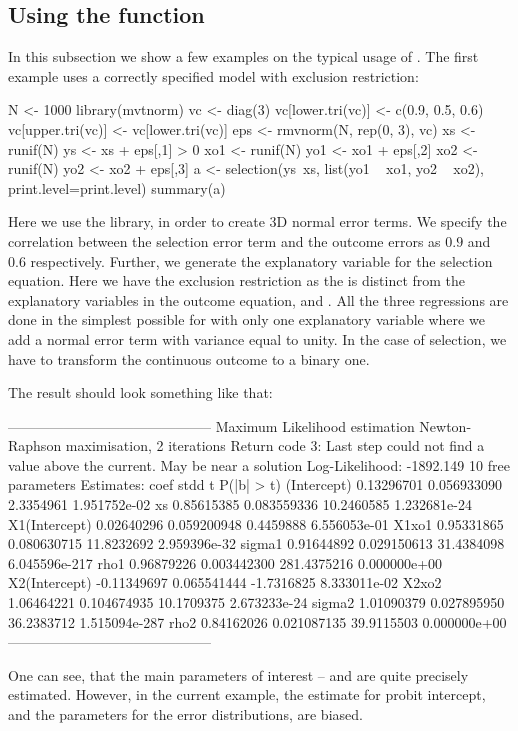 \subsection[Usage]{Using the  function}

In this subsection we show a few examples on the typical usage of
.  The first example uses a correctly specified model
with exclusion restriction:

\begin{Schunk}
\begin{Sinput}
  N <- 1000
  library(mvtnorm)
  vc <- diag(3)
  vc[lower.tri(vc)] <- c(0.9, 0.5, 0.6)
  vc[upper.tri(vc)] <- vc[lower.tri(vc)]
  eps <- rmvnorm(N, rep(0, 3), vc)
  xs <- runif(N)
  ys <- xs + eps[,1] > 0
  xo1 <- runif(N)
  yo1 <- xo1 + eps[,2]
  xo2 <- runif(N)
  yo2 <- xo2 + eps[,3]
  a <- selection(ys~xs, list(yo1 ~ xo1, yo2 ~ xo2), print.level=print.level)
  summary(a)
\end{Sinput}
\end{Schunk}

Here we use the  library, in order to create 3D normal
error terms.  We specify the correlation between the selection error
term and the outcome errors as $0.9$ and $0.6$ respectively.  Further,
we generate the explanatory variable  for the selection
equation.  Here we have the exclusion restriction as the  is
distinct from the explanatory variables in the outcome equation,
 and .  All the three regressions are done in the
simplest possible for with only one explanatory variable where we add
a normal error term with variance equal to unity.  In the case of
selection, we have to transform the continuous outcome to a binary
one.

The result should look something like that:
\begin{Schunk}
\begin{Soutput}
   --------------------------------------------
   Maximum Likelihood estimation
   Newton-Raphson maximisation, 2 iterations
   Return code 3: Last step could not find a value above the current.
   May be near a solution
   Log-Likelihood: -1892.149 
   10  free parameters
   Estimates:
   coef        stdd           t    P(|b| > t)
   (Intercept)    0.13296701 0.056933090   2.3354961  1.951752e-02
   xs             0.85615385 0.083559336  10.2460585  1.232681e-24
   X1(Intercept)  0.02640296 0.059200948   0.4459888  6.556053e-01
   X1xo1          0.95331865 0.080630715  11.8232692  2.959396e-32
   sigma1         0.91644892 0.029150613  31.4384098 6.045596e-217
   rho1           0.96879226 0.003442300 281.4375216  0.000000e+00
   X2(Intercept) -0.11349697 0.065541444  -1.7316825  8.333011e-02
   X2xo2          1.06464221 0.104674935  10.1709375  2.673233e-24
   sigma2         1.01090379 0.027895950  36.2383712 1.515094e-287
   rho2           0.84162026 0.021087135  39.9115503  0.000000e+00
   --------------------------------------------
\end{Soutput}
\end{Schunk}
One can see, that the main parameters of interest --  and
 are quite precisely estimated.  However, in the current
example, the estimate for probit intercept, and the parameters for the
error distributions, are biased.
